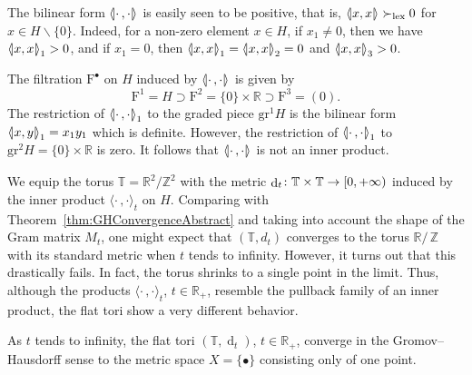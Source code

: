 \documentclass[AHL,Unicode,longabstracts]{cedram}
\newcommand{\innone}[2]{{\langle#2\rangle_{#1}}}
\newcommand{\llangle}{\mathopen{\langle\mkern -3.1mu\lvert}}
\newcommand{\rrangle}{\mathclose{\rvert\mkern -3.1mu\rangle}}
\newcommand{\highinn}[2]{{\llangle#2\rrangle_{#1}}}
\newcommand{\rquot}[2]{#1/\,#2}
\DeclareMathOperator{\dist}{d}
\newcommand{\filter}{\mathrm{F}}
\newcommand{\R}{\mathbb{R}}
\newcommand{\Z}{\mathbb{Z}}
\newcommand{\T}{\mathbb{T}}
\newcommand{\grm}[2]{\mathrm{gr}_{#1}^{#2}}
\renewcommand{\setminus}{\smallsetminus}
\newcommand{\gex}{\succ_{\mathrm{lex}}}
\renewcommand*{\to}{\mathchoice{\longrightarrow}{\rightarrow}{\rightarrow}{\rightarrow}}
\begin{document}
The bilinear form $\highinn{}{\cdot\,, \cdot}$ is easily seen to be positive, that is, $\highinn{}{x,x} \gex 0$ for $x \in H \setminus \{0\}$. Indeed, for a non-zero element $x \in H$, if $x_1\neq 0$, then we have $\highinn{1}{x,x}>0$, and if $x_1=0$, then $\highinn{1}{x,x} = \highinn{2}{x,x}=0$ and $\highinn{3}{x,x}>0$.

The filtration $\filter^\bullet$ on $H$ induced by $\highinn{}{\cdot \,, \cdot}$ is given by
\[
\filter^1 = H \supset \filter^2 =\{0\}\times \R \supset \filter^3=(0).
\]
The restriction of $\highinn{1}{\cdot\,, \cdot}$ to the graded piece $\grm{}{1}H$ is the bilinear form $\highinn{1}{x,y} = x_1y_1$ which is definite. However, the restriction of $\highinn{1}{\cdot\,, \cdot}$ to $\grm{}{2}H = \{0\}\times \R$ is zero. It follows that $\highinn{}{\cdot\,,\cdot}$ is not an inner product.


We equip the torus $\T = \R^2 / \Z^2$ with the metric $\dist_t \colon \T \times \T \to [0, +\infty)$ induced by the inner product $\innone{t}{\cdot\,, \cdot}$ on $H$. Comparing with Theorem~\ref{thm:GHConvergenceAbstract} and taking into account the shape of the Gram matrix $M_t$, one might expect that $(\T, d_t)$ converges to the torus $\rquot{\R}{\Z}$ with its standard metric when $t$ tends to infinity. However, it turns out that this drastically fails. In fact, the torus shrinks to a single point in the limit. Thus, although the products $\innone{t}{\cdot\,, \cdot}$, $t \in\R_+$, resemble the pullback family of an inner product, the flat tori show a very different behavior.

\begin{prop}\label{prop:metriccollapse}
As $t$ tends to infinity, the flat tori $(\T, \dist_t)$, $t \in \R_+$, converge in the Gromov--Hausdorff sense to the metric space $X = \{ \bullet \}$ consisting only of one point.
\end{prop}
\end{document}
